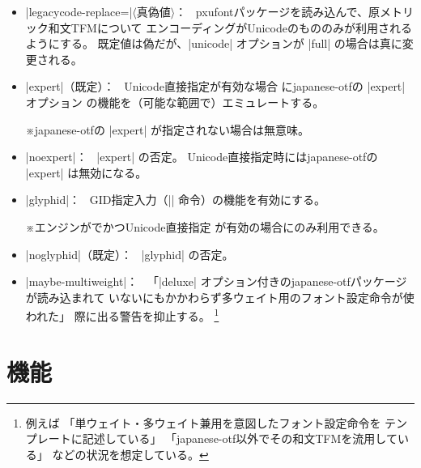 \documentclass[uplatex,dvipdfmx,a4paper]{jsarticle}
\newcommand{\Pkg}[1]{\textsf{#1}}
\newcommand{\Meta}[1]{$\langle$\mbox{}#1\mbox{}$\rangle$}
\newcommand{\Note}{\par\noindent ※}
\newcommand{\Means}{：\ }
\begin{document}
\begin{itemize}
  Unicode直接指定を全体に採用した場合
  \footnote{つまり、|unicode| オプションの値が |simple|
    または |full| である場合。
    ただし現状では |unicode| の値がこれ以外の場合でも |legacycode|
    の値は設定可能であるが、恐らく既定の |apply| 以外の設定は
    無益であろう。}%
  にエンコーディングがUnicodeではない原メトリック和文TFMに関する
  マップ行に対する取扱を規定する。
  有効な値は以下の通り\Means
  \begin{itemize}
  \item |apply|（既定）\Means
    “CMap指定”のマップ行を出力する。
  \item |ignore|\Means
    マップ行を出力しない。
  \item |suppress|\Means
    当該のTFMの無効化を指示するマップ行を出力する。
  \end{itemize}
  \Note |legacycode-replace| が真の場合は既定値が |suppress| に
  変更される。
\item |legacycode-replace=|\Meta{真偽値}\Means
  \Pkg{pxufont}パッケージを読み込んで、原メトリック和文TFMについて
  エンコーディングがUnicodeのもののみが利用されるようにする。
  既定値は偽だが、|unicode| オプションが |full| の場合は真に変更される。
\item |expert|（既定）\Means
  Unicode直接指定が有効な場合
  に\Pkg{japanese-otf}の |expert| オプション
  の機能を（可能な範囲で）エミュレートする。
  \Note \Pkg{japanese-otf}の |expert| が指定されない場合は無意味。
\item |noexpert|\Means
  |expert| の否定。
  Unicode直接指定時には\Pkg{japanese-otf}の |expert| は無効になる。
\item |glyphid|\Means
  GID指定入力（|\gid| 命令）の機能を有効にする。
  \Note エンジンが{\upLaTeX}でかつUnicode直接指定
  が有効の場合にのみ利用できる。
\item |noglyphid|（既定）\Means
  |glyphid| の否定。
\item |maybe-multiweight|\Means
  「|deluxe| オプション付きの\Pkg{japanese-otf}パッケージが読み込まれて
  いないにもかかわらず多ウェイト用のフォント設定命令が使われた」
  際に出る警告を抑止する。%
  \footnote{例えば
    「単ウェイト・多ウェイト兼用を意図したフォント設定命令を
    テンプレートに記述している」
    「\Pkg{japanese-otf}以外でその和文TFMを流用している」
    などの状況を想定している。}
\end{itemize}

\section{機能}
\label{sec:Usage}
\end{document}
